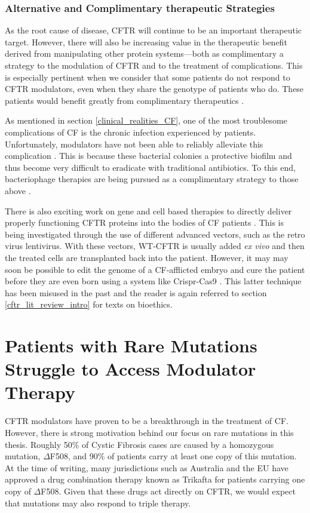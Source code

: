 \subsubsection{Alternative and Complimentary therapeutic Strategies}
As the root cause of disease, CFTR will continue to be an important therapeutic target. However, there will also be increasing value in the therapeutic benefit derived from manipulating other protein systems---both as complimentary a strategy to the modulation of CFTR and to the treatment of complications. This is especially pertinent when we consider that some patients do not respond to CFTR modulators, even when they share the genotype of patients who do. These patients would benefit greatly from complimentary therapeutics \cite{hanafin2021, robertson2015, lingam2017, seelig2020, barbieri2021a, grebert2019}. 

As mentioned in section \ref{clinical_realities_CF}, one of the most troublesome complications of CF is the chronic infection experienced by patients. Unfortunately, modulators have not been able to reliably alleviate this complication \cite{mallapaty2022}. This is because these bacterial colonies a protective biofilm and thus become very difficult to eradicate with traditional antibiotics. To this end, bacteriophage therapies are being pursued as a complimentary strategy to those above \cite{ng2021}. 

There is also exciting work on gene and cell based therapies to directly deliver properly functioning CFTR proteins into the bodies of CF patients \cite{allan2021}. This is being investigated through the use of different advanced vectors, such as the retro virus lentivirus. With these vectors, WT-CFTR is usually added \textit{ex vivo} and then the treated cells are transplanted back into the patient. However, it may may soon be possible to edit the genome of a CF-afflicted embryo and cure the patient before they are even born using a system like Crispr-Cas9 \cite{ledford2020}. This latter technique has been misused in the past \cite{mallapaty2022} and the reader is again referred to section \ref{cftr_lit_review_intro} for texts on bioethics. 

\section{Patients with Rare Mutations Struggle to Access Modulator Therapy}
CFTR modulators have proven to be a breakthrough in the treatment of CF. However, there is strong motivation behind our focus on rare mutations in this thesis. Roughly 50\% of Cystic Fibrosis cases are caused by a homozygous mutation, $\Delta$F508, and 90\% of patients carry at least one copy of this mutation. At the time of writing, many jurisdictions such as Australia and the EU have approved a drug combination therapy known as Trikafta for patients carrying one copy of $\Delta$F508. Given that these drugs act directly on CFTR, we would expect that mutations may also respond to triple therapy. 

